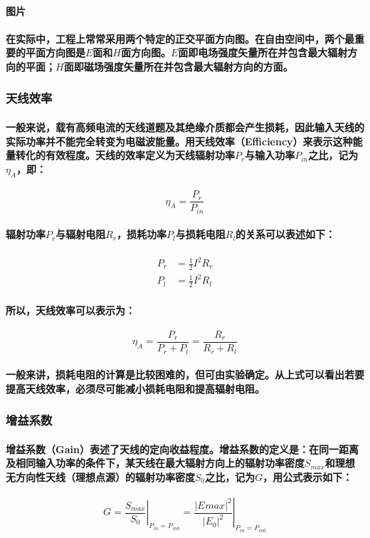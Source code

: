 \documentclass[UTF8]{ctexart}
\begin{document}
\paragraph{图片}
\paragraph{在实际中，工程上常常采用两个特定的正交平面方向图。在自由空间中，两个最重要的平面方向图是$E$面和$H$面方向图。$E$面即电场强度矢量所在并包含最大辐射方向的平面；$H$面即磁场强度矢量所在并包含最大辐射方向的方面。}
\subsubsection{天线效率}
\paragraph{一般来说，载有高频电流的天线道题及其绝缘介质都会产生损耗，因此输入天线的实际功率并不能完全转变为电磁波能量。用天线效率（Efficiency）来表示这种能量转化的有效程度。天线的效率定义为天线辐射功率$P_{r}$与输入功率$P_{in}$之比，记为$\eta_{A}$，即：}
\begin{equation}
\eta_{A} = \frac{P_r}{P_{in}}
\end{equation}
\paragraph{辐射功率$P_{r}$与辐射电阻$R_r$，损耗功率$P_l$与损耗电阻$R_l$的关系可以表述如下：}
\begin{align}
P_r &= \frac{1}{2}I^2R_r\\P_l &= \frac{1}{2}I^2R_l
\end{align}
\paragraph{所以，天线效率可以表示为：}
\begin{equation}
\eta_A = \frac{P_r}{P_r + P_l}=\frac{R_r}{R_r + R_l}
\end{equation}
\paragraph{一般来讲，损耗电阻的计算是比较困难的，但可由实验确定。从上式可以看出若要提高天线效率，必须尽可能减小损耗电阻和提高辐射电阻。}
\subsubsection{增益系数}
\paragraph{增益系数（Gain）表述了天线的定向收益程度。增益系数的定义是：在同一距离及相同输入功率的条件下，某天线在最大辐射方向上的辐射功率密度$S_{max}$和理想无方向性天线（理想点源）的辐射功率密度$S_{0}$之比，记为$G$，用公式表示如下：}
\begin{equation}
G = \left.\frac{S_{max}}{S_{0}}\right|_{P_{in}=P_{in0}}=\left.\frac{|E_{}max|^2}{|E_{0}|^2}\right|_{P_{in}=P_{in0}}
\end{equation}
\end{document}
